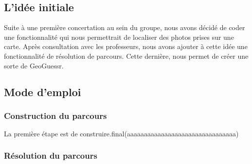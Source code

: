 \subsection{L'idée initiale}
Suite à une première concertation au sein du groupe, nous avons décidé de coder une fonctionnalité qui nous permettrait de localiser des photos prises sur une carte. Après consultation avec les professeurs, nous avons ajouter à cette idée une fonctionnalité de résolution de parcours. Cette dernière, nous permet de créer une sorte de GeoGuessr. 

\subsection{Mode d'emploi}
\subsubsection{Construction du parcours}
La première étape est de construire.final(aaaaaaaaaaaaaaaaaaaaaaaaaaaaaaaa)

\subsubsection{Résolution du parcours}